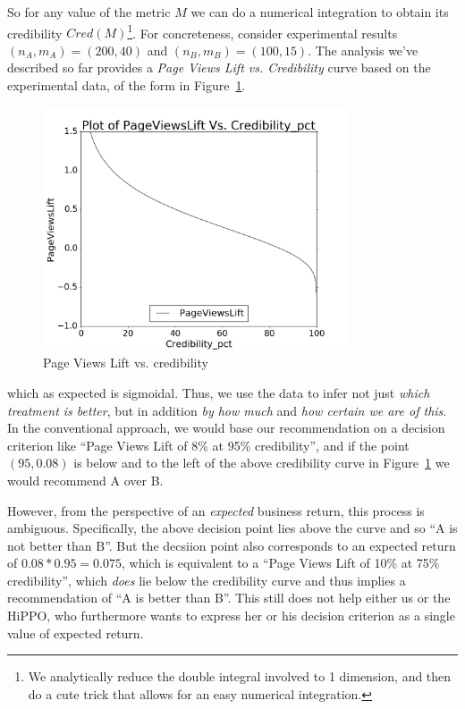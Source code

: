 \documentclass[letterpaper,12pt]{article}
\begin{document}
So for
any value of the metric \(M\) we can do a numerical integration to obtain its credibility \(Cred(M)\)\footnote{We analytically reduce the double integral involved to 1 dimension,
and then do a cute trick that allows for an easy numerical integration.}. For
concreteness, consider experimental results \((n_A, m_A) = (200, 40)\)
and \((n_B, m_B) = (100, 15)\). The analysis we've described so far
provides a {\em Page Views Lift vs. Credibility} curve based on the
experimental data, of the form in Figure~\ref{fig:pv_vs_cred}.
\begin{figure}[ht!]
\centering
\includegraphics[width=90mm]{figures/PageViewsLift}
\caption{Page Views Lift vs. credibility \label{fig:pv_vs_cred}}
\end{figure}
which as expected is sigmoidal. Thus, we use the data to infer not
just {\em which treatment is better}, but in addition {\em by how
  much} and {\em how certain we are of this}.  In the conventional
approach, we would base our recommendation on a decision criterion
like ``Page Views Lift of 8\% at 95\%
credibility'', and if the point \((95, 0.08)\) is below and to the left of the
above credibility curve in Figure~\ref{fig:pv_vs_cred} we would recommend A over B.

However, from the
perspective of an {\em expected} business return, this process is
ambiguous. Specifically, the above decision point lies above the curve
and so ``A is not better than B''. But the decsiion point also
corresponds to an expected return of \(0.08*0.95 = 0.075\), which is
equivalent to a ``Page Views Lift of 10\% at 75\%
credibility'', which {\em does} lie below the credibility curve and thus
implies a recommendation of ``A is better than B''.
This still does not help either us or the HiPPO, who furthermore
wants to express her or his decision criterion as a single value of expected
return.
\end{document}
